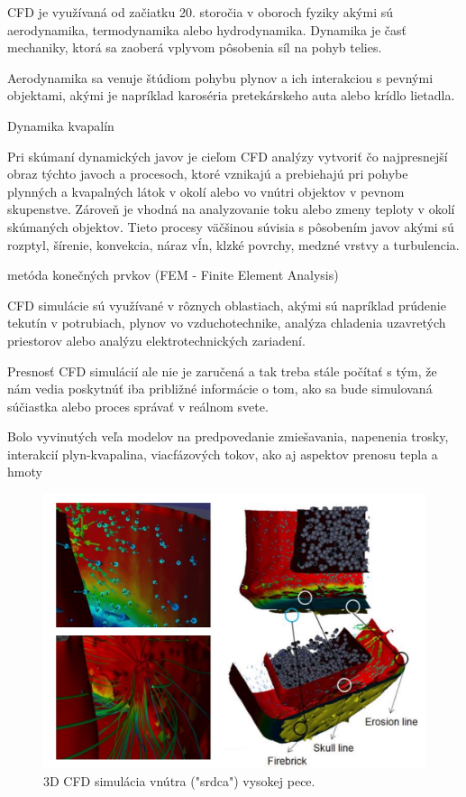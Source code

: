 \documentclass[]{tukediphc}
\begin{document}
CFD je využívaná od začiatku 20. storočia v oboroch fyziky akými sú aerodynamika, termodynamika alebo hydrodynamika. Dynamika je časť mechaniky, ktorá sa zaoberá vplyvom pôsobenia síl na pohyb telies.

Aerodynamika sa venuje štúdiom pohybu plynov a ich interakciou s pevnými objektami, akými je napríklad karoséria pretekárskeho auta alebo krídlo lietadla. 

Dynamika kvapalín

Pri skúmaní dynamických javov je cieľom CFD analýzy vytvoriť čo najpresnejší obraz týchto javoch a procesoch, ktoré vznikajú a prebiehajú pri pohybe plynných a kvapalných látok v okolí alebo vo vnútri objektov v pevnom skupenstve. Zároveň je vhodná na analyzovanie toku alebo zmeny teploty v okolí skúmaných objektov. Tieto procesy väčšinou súvisia s pôsobením javov akými sú rozptyl, šírenie, konvekcia, náraz vĺn, klzké povrchy, medzné vrstvy a turbulencia.


metóda konečných prvkov (FEM - Finite Element Analysis)


CFD simulácie sú využívané v rôznych oblastiach, akými sú napríklad prúdenie tekutín v potrubiach, plynov vo vzduchotechnike, analýza chladenia uzavretých priestorov alebo analýzu elektrotechnických zariadení.

Presnosť CFD simulácií ale nie je zaručená a tak treba stále počítať s tým, že nám vedia poskytnúť iba približné informácie o tom, ako sa bude simulovaná súčiastka alebo proces správať v reálnom svete. 



Bolo vyvinutých veľa modelov na predpovedanie zmiešavania, napenenia trosky, interakcií plyn-kvapalina, viacfázových tokov, ako aj aspektov prenosu tepla a hmoty

\citep{chattopadhyay2010}


\begin{figure}[!ht]
	\centering
	\includegraphics[width=.8\textwidth,angle=0]{figures/blast-furnace-erosion-vr.jpg}
	\caption{3D CFD simulácia vnútra ("srdca") vysokej pece.}
\end{figure}
\end{document}
